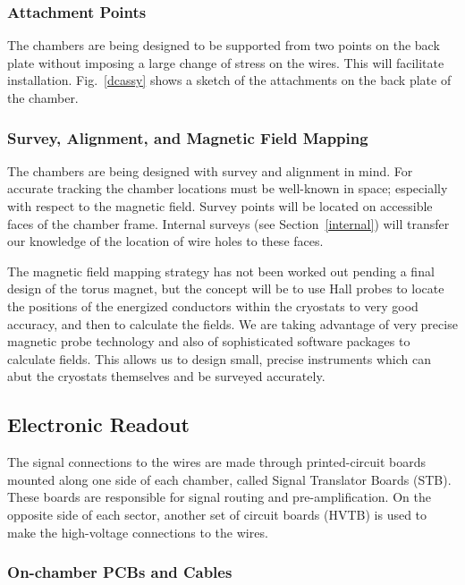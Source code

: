 \documentclass[12pt]{article}
\begin{document}
\subsubsection{Attachment Points}

The chambers are being designed to be supported from two points on the back 
plate without imposing a large change of stress on the wires.  This will 
facilitate installation.  Fig.~\ref{dcassy} shows a sketch of the 
attachments on the back plate of the chamber.


\subsubsection{Survey, Alignment, and Magnetic Field Mapping}

The chambers are being designed with survey and alignment in mind.  For 
accurate tracking the chamber locations must be well-known in space; 
especially with respect to the magnetic field.  Survey points will be 
located on accessible faces of the chamber frame.  Internal surveys 
(see Section~\ref{internal}) will transfer our knowledge of the location 
of wire holes to these faces.

The magnetic field mapping strategy has not been worked out pending
a final design of the torus magnet, but the concept will be to use
Hall probes to locate the positions of the energized conductors within
the cryostats to very good accuracy, and then to calculate the fields.
We are taking advantage of very precise magnetic probe technology and
also of sophisticated software packages to calculate fields.
This allows us to design small, precise instruments which can abut
the cryostats themselves and be surveyed accurately.

\subsection{Electronic Readout}

The signal connections to the wires are made through printed-circuit boards
mounted along one side of each chamber, called Signal Translator 
Boards (STB).  These boards are responsible for signal
routing and pre-amplification.  On the opposite side of each sector, another
set of circuit boards (HVTB) is used to make the high-voltage connections
to the wires.

\subsubsection{On-chamber PCBs and Cables}
\end{document}
